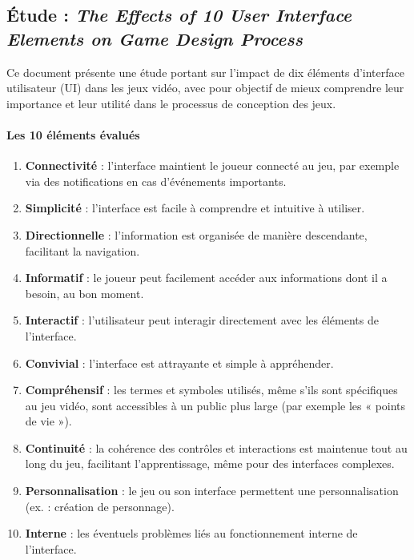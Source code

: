 

\subsection{Étude : \textit{The Effects of 10 User Interface Elements on Game Design Process \cite{UIpaper}}}

Ce document présente une étude portant sur l'impact de dix éléments d'interface utilisateur (UI) dans les jeux vidéo, avec pour objectif de mieux comprendre leur importance et leur utilité dans le processus de conception des jeux.

\paragraph{Les 10 éléments évalués}

\begin{enumerate}
    \item \textbf{Connectivité} : l’interface maintient le joueur connecté au jeu, par exemple via des notifications en cas d’événements importants.
    \item \textbf{Simplicité} : l’interface est facile à comprendre et intuitive à utiliser.
    \item \textbf{Directionnelle} : l’information est organisée de manière descendante, facilitant la navigation.
    \item \textbf{Informatif} : le joueur peut facilement accéder aux informations dont il a besoin, au bon moment.
    \item \textbf{Interactif} : l’utilisateur peut interagir directement avec les éléments de l’interface.
    \item \textbf{Convivial} : l’interface est attrayante et simple à appréhender.
    \item \textbf{Compréhensif} : les termes et symboles utilisés, même s’ils sont spécifiques au jeu vidéo, sont accessibles à un public plus large (par exemple les « points de vie »).
    \item \textbf{Continuité} : la cohérence des contrôles et interactions est maintenue tout au long du jeu, facilitant l’apprentissage, même pour des interfaces complexes.
    \item \textbf{Personnalisation} : le jeu ou son interface permettent une personnalisation (ex. : création de personnage).
    \item \textbf{Interne} : les éventuels problèmes liés au fonctionnement interne de l’interface.
\end{enumerate}

